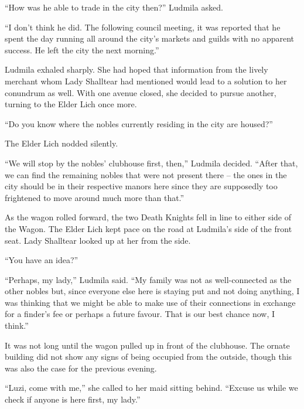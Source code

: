 “How was he able to trade in the city then?” Ludmila asked.

 

“I don’t think he did. The following council meeting, it was reported that he spent the day running all around the city’s markets and guilds with no apparent success. He left the city the next morning.”

 

Ludmila exhaled sharply. She had hoped that information from the lively merchant whom Lady Shalltear had mentioned would lead to a solution to her conundrum as well. With one avenue closed, she decided to pursue another, turning to the Elder Lich once more.

 

“Do you know where the nobles currently residing in the city are housed?”

 

The Elder Lich nodded silently.

 

“We will stop by the nobles’ clubhouse first, then,” Ludmila decided. “After that, we can find the remaining nobles that were not present there – the ones in the city should be in their respective manors here since they are supposedly too frightened to move around much more than that.”

 

As the wagon rolled forward, the two Death Knights fell in line to either side of the Wagon. The Elder Lich kept pace on the road at Ludmila’s side of the front seat. Lady Shalltear looked up at her from the side.

 

“You have an idea?”

 

“Perhaps, my lady,” Ludmila said. “My family was not as well-connected as the other nobles but, since everyone else here is staying put and not doing anything, I was thinking that we might be able to make use of their connections in exchange for a finder’s fee or perhaps a future favour. That is our best chance now, I think.”

 

It was not long until the wagon pulled up in front of the clubhouse. The ornate building did not show any signs of being occupied from the outside, though this was also the case for the previous evening.

 

“Luzi, come with me,” she called to her maid sitting behind. “Excuse us while we check if anyone is here first, my lady.”

